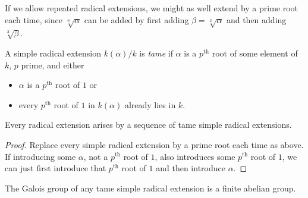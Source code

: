 \begin{example}
If we allow repeated radical extensions, we might as well extend by a prime root each time, since \(\sqrt[6]{\alpha}\) can be added by first adding \(\beta=\sqrt[2]{\alpha}\) and then adding \(\sqrt[3]{\beta}\).
\end{example}
A simple radical extension \(k(\alpha)/k\) is \emph{tame} if \(\alpha\) is a \(p^{\text{th}}\) root of some element of \(k\), \(p\) prime, and either
\begin{itemize}
\item \(\alpha\) is a \(p^{\text{th}}\) root of \(1\) or
\item every \(p^{\text{th}}\) root of \(1\) in \(k(\alpha)\) already lies in \(k\).
\end{itemize}
\begin{lemma}
Every radical extension arises by a sequence of tame simple radical extensions.
\end{lemma}
\begin{proof}
Replace every simple radical extension by a prime root each time as above.
If introducing some \(\alpha\), not a \(p^{\text{th}}\) root of \(1\), also introduces some \(p^{\text{th}}\) root of \(1\), we can just first introduce that \(p^{\text{th}}\) root of \(1\) and then introduce \(\alpha\).
\end{proof}
\begin{lemma}
The Galois group of any tame simple radical extension is a finite abelian group.
\end{lemma}
